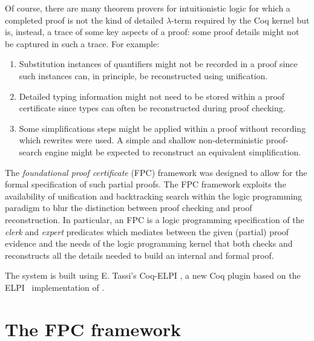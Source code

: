 \documentclass{llncs}
\begin{document}
Of course, there are many theorem provers for intuitionistic logic for
which a completed proof is not the kind of detailed $\lambda$-term
required by the Coq kernel but is, instead, a trace of some key
aspects of a proof: some proof details might not be captured in such a
trace.  For example:
\begin{enumerate}
\item  Substitution instances of quantifiers might not be
recorded in a proof since such instances can, in principle, be
reconstructed using unification.
\item  Detailed typing information might not need to be stored
within a proof certificate since types can often be reconstructed
during proof checking.
%
%
\item Some simplifications steps might be applied within a proof
  without recording which rewrites were used.  A simple and shallow
  non-deterministic proof-search engine might be expected to
  reconstruct an equivalent simplification.
\end{enumerate}


The \emph{foundational proof certificate} (FPC) framework
\cite{chihani17jar} was designed to allow for the formal specification
of such partial proofs.
%
The FPC framework exploits the availability of unification and
backtracking search within the logic programming paradigm to blur the
distinction between proof checking and proof reconstruction. 
%
In particular, an FPC is a logic programming specification of the
\emph{clerk} and \emph{expert} predicates which mediates between the
given (partial) proof evidence and the needs of the logic programming
kernel that both checks and reconstructs all the details needed to
build an internal and formal proof.

The \fpccoq system is built using E. Tassi's Coq-ELPI
\cite{tassi18coqpl,coq-elpi20web}, a new Coq plugin based on the
ELPI~\cite{dunchev15lpar} implementation of \lP
\cite{miller12proghol}.


\section{The FPC framework}
\end{document}
